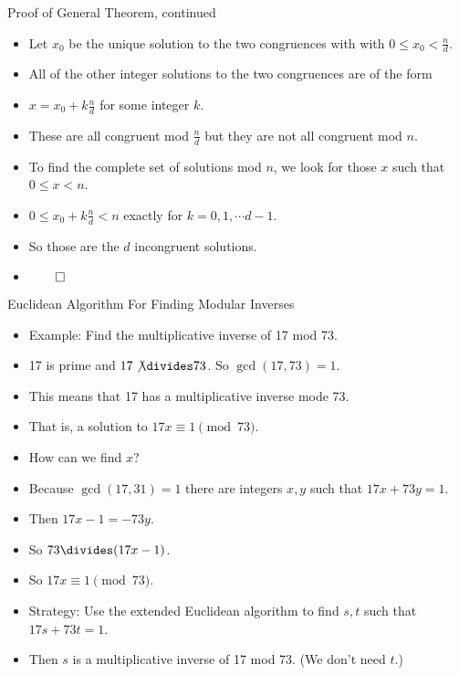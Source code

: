 \documentclass{beamer}
\begin{document}
\begin{frame}{Proof of General Theorem, continued}
\begin{itemize}
  \item Let $x_0$ be the unique solution to the two congruences with
 with $0\leq x_0 < \frac{n}{d}$.
  \item All of the other integer solutions to the two congruences are of the form
  \item $x=x_0+k\frac{n}{d}$ for some integer $k$.
  \item These are all congruent mod $\frac{n}{d}$ but they are not all congruent mod $n$.
  \item To find the complete set of solutions mod $n$, we look for those $x$ such that $0\leq x < n$.
  \item $0\leq x_0+k\frac{n}{d} < n$ exactly for $k=0,1,\cdots d-1$.
  \item So those are the $d$ incongruent solutions.
  \item $\qed$
\end{itemize}
\end{frame}

\begin{frame}{Euclidean Algorithm For Finding Modular Inverses}
\begin{itemize}
  \item Example: Find the multiplicative inverse of 17 mod 73.
  \item 17 is prime and $17\not\divides 73$. So $\gcd(17,73)=1$.
  \item This means that 17 has a multiplicative inverse mode 73.
  \item That is, a solution to $17x\equiv 1 \pmod{73}$.
  \item How can we find $x$?
  \item Because $\gcd(17,31)=1$ there are integers $x,y$ such that $17x + 73y = 1$.
  \item Then $17x - 1 = -73y$.
  \item So $73\divides (17x-1)$.
  \item So $17x\equiv 1 \pmod{73}$.
  \item Strategy: Use the extended Euclidean algorithm to find $s,t$ such that $17s + 73t = 1$.
  \item Then $s$ is a multiplicative inverse of 17 mod 73. (We don't need $t$.)
\end{itemize}
\end{frame}
\end{document}
